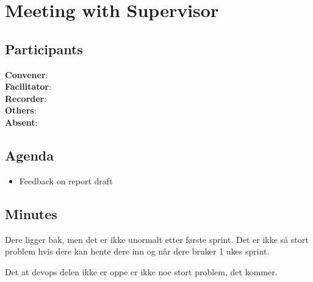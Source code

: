 \section*{Meeting with Supervisor}

\subsection*{Participants}

\textbf{Convener}: \supervisor{}\\
\textbf{Facilitator}: \facilitator{}  \\
\textbf{Recorder}: \scrummaster{}  \\
\textbf{Others}:                           \\
\textbf{Absent}: \groupleader{}

\subsection*{Agenda}
\begin{itemize}
    \item Feedback on report draft

\end{itemize}

\subsection*{Minutes}
Dere ligger bak, men det er ikke unormalt etter første sprint. Det er ikke så stort problem hvis dere kan hente dere inn og når dere bruker 1 ukes sprint. 

Det at devops delen ikke er oppe er ikke noe stort problem, det kommer. 

\newpage